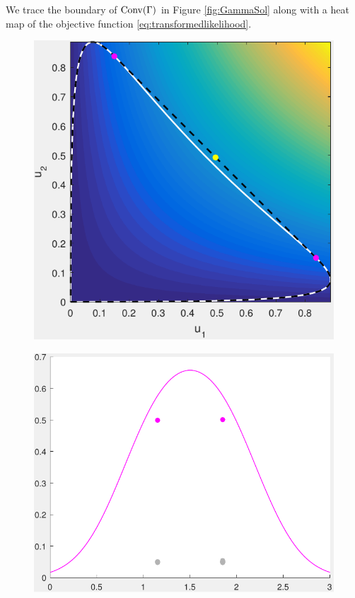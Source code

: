 		We trace the boundary of $\mathrm{Conv}(\Gamma)$ in Figure \ref{fig:GammaSol} along with a heat map of the objective function \eqref{eq:transformedlikelihood}.
		\begin{figure}[ht]
			\centering
			\begin{minipage}{0.4\textwidth}
				\includegraphics[width = \textwidth]{GammaOptimHullSol}
				\subcaption{}\label{fig:GammaSol:subfig:Gamma}
			\end{minipage}
			\begin{minipage}{0.5\textwidth}
				\includegraphics[width = \textwidth]{MixingSolSigma045}				\subcaption{}\label{fig:GammaSol:subfig:Density}

\end{minipage}
\end{figure}
